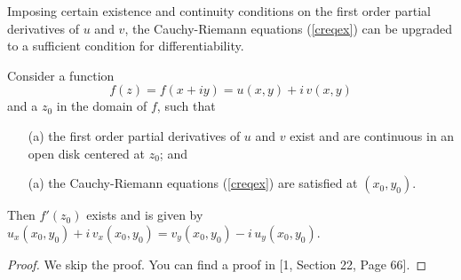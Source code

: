 Imposing certain existence and continuity conditions on the first order partial derivatives of $u$ and $v$, the Cauchy-Riemann equations (\ref{creqex}) can be upgraded to a sufficient condition for differentiability.
\begin{theorem}\label{crsuff}
Consider a function \[f(z) = f(x + iy) = u(x,y) + i\,v(x,y)\]
and a $z_0$ in the domain of $f$, such that
\begin{itemize}
\item[(a)] the first order partial derivatives of $u$ and $v$ exist and are continuous in an open disk centered at $z_0$; and
\item[(a)] the Cauchy-Riemann equations (\ref{creqex}) are satisfied at $(x_0,y_0)$.
\end{itemize}
Then $f'(z_0)$ exists and is given by $u_x(x_0,y_0) + i\,v_x(x_0,y_0) = v_y(x_0,y_0)-i\,u_y(x_0,y_0)$.
\end{theorem}
\begin{proof}
We skip the proof. You can find a proof in [1, Section 22, Page 66].
\end{proof}

\vspace*{1.5em}

